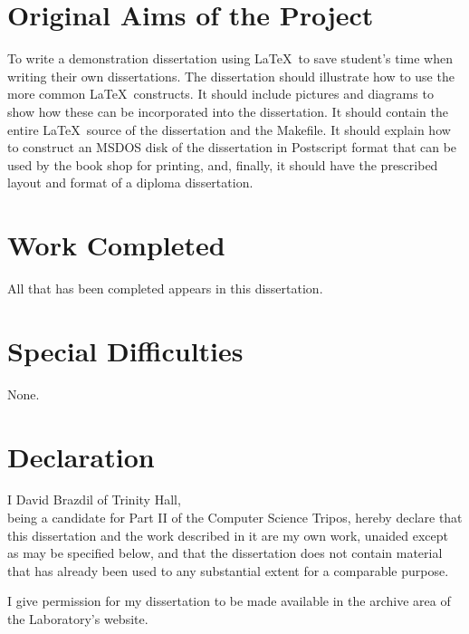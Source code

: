 \documentclass[12pt,twoside,notitlepage]{report}
\begin{document}

\section*{Original Aims of the Project}

To write a demonstration dissertation using \LaTeX\ to save
student's time when writing their own dissertations. The dissertation
should illustrate how to use the more common \LaTeX\ constructs. It
should include pictures and diagrams to show how these can be
incorporated into the dissertation.  It should contain the entire
\LaTeX\ source of the dissertation and the Makefile.  It should
explain how to construct an MSDOS disk of the dissertation in
Postscript format that can be used by the book shop for printing, and,
finally, it should have the prescribed layout and format of a diploma
dissertation.

\section*{Work Completed}

All that has been completed appears in this dissertation.

\section*{Special Difficulties}

None.
 
\newpage
\section*{Declaration}

I David Brazdil of Trinity Hall,\\
being a candidate for Part II of the Computer Science Tripos,
hereby declare that this dissertation and the work described in it
are my own work, unaided except as may be specified below, and
that the dissertation does not contain material that has already
been used to any substantial extent for a comparable purpose.

I give permission for my dissertation to be made available in the archive
area of the Laboratory's website.

\bigskip
\bigskip
{}
\end{document}
